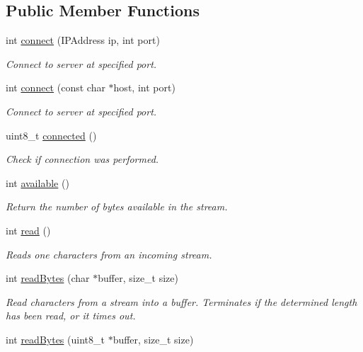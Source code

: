 \subsection*{Public Member Functions}
\begin{DoxyCompactItemize}
\item 
int \hyperlink{classsim800Client_a2c26282b71132af7f50becb62d9fe0f4}{connect} (I\+P\+Address ip, int port)
\begin{DoxyCompactList}\small\item\em Connect to server at specified port. \end{DoxyCompactList}\item 
int \hyperlink{classsim800Client_ae74b00f32682498c63b05dd615705ea7}{connect} (const char $\ast$host, int port)
\begin{DoxyCompactList}\small\item\em Connect to server at specified port. \end{DoxyCompactList}\item 
uint8\+\_\+t \hyperlink{classsim800Client_ad3a5903a0f8c264ec445edafe167f4f0}{connected} ()
\begin{DoxyCompactList}\small\item\em Check if connection was performed. \end{DoxyCompactList}\item 
int \hyperlink{classsim800Client_ae6648c39586919bddcc5c1d24f395767}{available} ()
\begin{DoxyCompactList}\small\item\em Return the number of bytes available in the stream. \end{DoxyCompactList}\item 
int \hyperlink{classsim800Client_adafda98d2cc49e401053b3ba521d49b4}{read} ()
\begin{DoxyCompactList}\small\item\em Reads one characters from an incoming stream. \end{DoxyCompactList}\item 
int \hyperlink{classsim800Client_ac200fe43c977c3b6f981b07206ea0e4c}{read\+Bytes} (char $\ast$buffer, size\+\_\+t size)
\begin{DoxyCompactList}\small\item\em Read characters from a stream into a buffer. Terminates if the determined length has been read, or it times out. \end{DoxyCompactList}\item 
int \hyperlink{classsim800Client_a961a22382e23d4ce928a60098cc13973}{read\+Bytes} (uint8\+\_\+t $\ast$buffer, size\+\_\+t size)

\end{DoxyCompactItemize}
